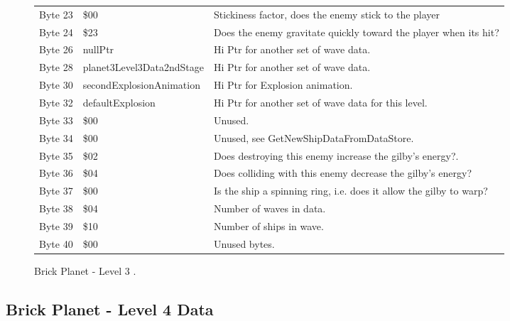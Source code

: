 \begin{figure}[H]
{\begin{adjustbox}{width=12cm}
\begin{tabular}{lll}
 Byte 23 & \$00                       & Stickiness factor, does the enemy stick to the player              \\
 Byte 24 & \$23                       & Does the enemy gravitate quickly toward the player when its hit?   \\
 Byte 26 & nullPtr                   & Hi Ptr for another set of wave data.                               \\
 Byte 28 & planet3Level3Data2ndStage & Hi Ptr for another set of wave data.                               \\
 Byte 30 & secondExplosionAnimation  & Hi Ptr for Explosion animation.                                    \\
 Byte 32 & defaultExplosion          & Hi Ptr for another set of wave data for this level.                \\
 Byte 33 & \$00                       & Unused.                                                            \\
 Byte 34 & \$00                       & Unused, see GetNewShipDataFromDataStore.                           \\
 Byte 35 & \$02                       & Does destroying this enemy increase the gilby's energy?.           \\
 Byte 36 & \$04                       & Does colliding with this enemy decrease the gilby's energy?        \\
 Byte 37 & \$00                       & Is the ship a spinning ring, i.e. does it allow the gilby to warp? \\
 Byte 38 & \$04                       & Number of waves in data.                                           \\
 Byte 39 & \$10                       & Number of ships in wave.                                           \\
 Byte 40 & \$00                       & Unused bytes.                                                      \\
\bottomrule
\end{tabular}

  \end{adjustbox}

  }\caption*{Brick Planet - Level 3
.}
\end{figure}

\clearpage
\subsection{Brick Planet - Level 4 Data}

